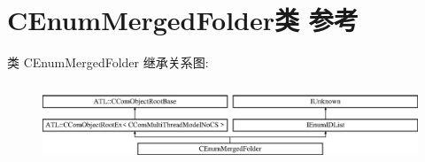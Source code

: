 \hypertarget{class_c_enum_merged_folder}{}\section{C\+Enum\+Merged\+Folder类 参考}
\label{class_c_enum_merged_folder}
类 C\+Enum\+Merged\+Folder 继承关系图\+:\begin{figure}[H]
\begin{center}
\leavevmode
\includegraphics[height=2.386364cm]{class_c_enum_merged_folder}
\end{center}
\end{figure}
